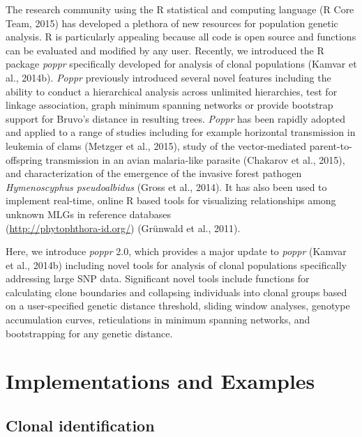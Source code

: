 \documentclass{frontiersSCNS} %
\begin{document}
The research community using the R statistical and computing language (R
Core Team, 2015) has developed a plethora of new resources for
population genetic analysis. R is particularly appealing because all
code is open source and functions can be evaluated and modified by any
user. Recently, we introduced the R package \emph{poppr} specifically
developed for analysis of clonal populations (Kamvar et al., 2014b).
\emph{Poppr} previously introduced several novel features including the
ability to conduct a hierarchical analysis across unlimited hierarchies,
test for linkage association, graph minimum spanning networks or provide
bootstrap support for Bruvo's distance in resulting trees. \emph{Poppr}
has been rapidly adopted and applied to a range of studies including for
example horizontal transmission in leukemia of clams (Metzger et al.,
2015), study of the vector-mediated parent-to-offspring transmission in
an avian malaria-like parasite (Chakarov et al., 2015), and
characterization of the emergence of the invasive forest pathogen
\emph{Hymenoscyphus pseudoalbidus} (Gross et al., 2014). It has also
been used to implement real-time, online R based tools for visualizing
relationships among unknown MLGs in reference
databases\\(\url{http://phytophthora-id.org/}) (Gr{ü}nwald et al.,
2011).

Here, we introduce \emph{poppr} 2.0, which provides a major update to
\emph{poppr} (Kamvar et al., 2014b) including novel tools for analysis
of clonal populations specifically addressing large SNP data.
Significant novel tools include functions for calculating clone
boundaries and collapsing individuals into clonal groups based on a
user-specified genetic distance threshold, sliding window analyses,
genotype accumulation curves, reticulations in minimum spanning
networks, and bootstrapping for any genetic distance.

\section*{Implementations and
Examples}\label{implementations-and-examples}

\subsection*{Clonal identification}\label{clonal-identification}
\end{document}
